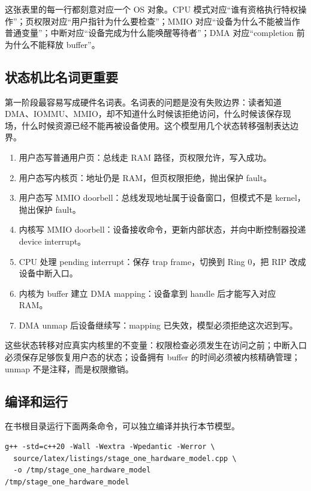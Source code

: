 这张表里的每一行都刻意对应一个 OS 对象。CPU 模式对应“谁有资格执行特权操作”；页权限对应“用户指针为什么要检查”；MMIO 对应“设备为什么不能被当作普通变量”；中断对应“设备完成为什么能唤醒等待者”；DMA 对应“completion 前为什么不能释放 buffer”。

\subsection{状态机比名词更重要}

第一阶段最容易写成硬件名词表。名词表的问题是没有失败边界：读者知道 DMA、IOMMU、MMIO，却不知道什么时候该拒绝访问，什么时候该保存现场，什么时候资源已经不能再被设备使用。这个模型用几个状态转移强制表达边界。

\begin{enumerate}
\tightlist
\item 用户态写普通用户页：总线走 RAM 路径，页权限允许，写入成功。
\item 用户态写内核页：地址仍是 RAM，但页权限拒绝，抛出保护 fault。
\item 用户态写 MMIO doorbell：总线发现地址属于设备窗口，但模式不是 kernel，抛出保护 fault。
\item 内核写 MMIO doorbell：设备接收命令，更新内部状态，并向中断控制器投递 device interrupt。
\item CPU 处理 pending interrupt：保存 trap frame，切换到 Ring 0，把 RIP 改成设备中断入口。
\item 内核为 buffer 建立 DMA mapping：设备拿到 handle 后才能写入对应 RAM。
\item DMA unmap 后设备继续写：mapping 已失效，模型必须拒绝这次迟到写。
\end{enumerate}

这些状态转移对应真实内核里的不变量：权限检查必须发生在访问之前；中断入口必须保存足够恢复用户态的状态；设备拥有 buffer 的时间必须被内核精确管理；unmap 不是注释，而是权限撤销。

\subsection{编译和运行}

在书根目录运行下面两条命令，可以独立编译并执行本节模型。

\begin{lstlisting}
g++ -std=c++20 -Wall -Wextra -Wpedantic -Werror \
  source/latex/listings/stage_one_hardware_model.cpp \
  -o /tmp/stage_one_hardware_model
/tmp/stage_one_hardware_model
\end{lstlisting}

